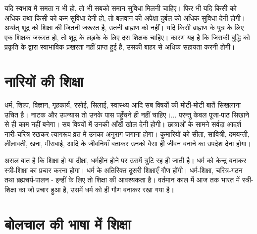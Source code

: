 यदि स्वभाव में समता न भी हो, तो भी सबको समान सुविधा मिलनी चाहिए। फिर भी यदि किसी को अधिक तथा किसी को कम सुविधा देनी हो, तो बलवान की अपेक्षा दुर्बल को अधिक सुविधा देनी होगी। अर्थात् शूद्र को शिक्षा की जितनी जरूरत है, उतनी ब्राह्मण को नहीं। यदि किसी ब्राह्मण के पुत्र के लिए एक शिक्षक जरूरत हो, तो शूद्र के लड़के के लिए दस शिक्षक चाहिए। कारण यह है कि जिसकी बुद्धि को प्रकृति के द्वारा स्वाभाविक प्रखरता नहीं प्राप्त हुई है, उसकी बाहर से अधिक सहायता करनी होगी।


\section*{नारियों की शिक्षा}


धर्म, शिल्प, विज्ञान, गृहकार्य, रसोई, सिलाई, स्वास्थ्य आदि सब विषयों की मोटी-मोटी बातें सिखलाना उचित है। नाटक और उपन्यास तो उनके पास पहुँचने ही नहीं चाहिए।... परन्तु केवल पूजा-पाठ सिखाने से ही काम नहीं बनेगा। सब विषयों में उनकी आँखें खोल देनी होगी। छात्राओं के सामने सर्वदा आदर्श नारी-चरित्र रखकर त्यागरूप व्रत में उनका अनुराग जगाना होगा। कुमारियों को सीता, सावित्री, दमयन्ती, लीलावती, खना, मीराबाई, आदि के जीवनियाँ बताकर उनको वैसा ही जीवन बनाने का उपदेश देना होगा। 

असल बात है कि शिक्षा हो या दीक्षा, धर्महीन होने पर उसमें त्रुटि रह ही जाती है। धर्म को केन्द्र बनाकर स्त्री-शिक्षा का प्रचार करना होगा। धर्म के अतिरिक्त दूसरी शिक्षाएँ गौण होंगी। धर्म-शिक्षा, चरित्र-गठन तथा ब्रह्यचर्य-पालन - इन्हीं के लिए तो शिक्षा की आवश्यकता है। वर्तमान काल में आज तक भारत में स्त्री-शिक्षा का जो प्रचार हुआ है, उसमें धर्म को ही गौण बनाकर रखा गया है।


\section*{बोलचाल की भाषा में शिक्षा}


